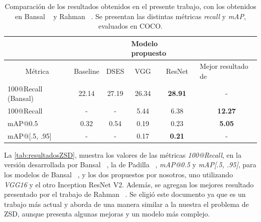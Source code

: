 \begin{table}[H]
	\centering
	\resizebox{\textwidth}{!} {
		\begin{tabular}{|l|c|c|c|c|c|}
			\hline
    		\multicolumn{3}{|l|}{}                                                   & \multicolumn{2}{l|}{Modelo propuesto}               &                               \\ \hline
			\multicolumn{1}{|c|}{{Métrica}} & {Baseline \cite{bansal2018zero}} & \multicolumn{1}{l|}{{DSES \cite{bansal2018zero}}} & {VGG} & { ResNet} & \multicolumn{1}{l|}{{Mejor resultado de \cite{rahman2020zero}}} \\ \hline
			100@Recall (Bansal)             & 22.14                            & 27.19                                             & 26.34              & \textbf{28.91}                 & -                                                               \\ \hline
			100@Recall                      & -                                & -                                                 & 5.44               & 6.38                  & \textbf{12.27}                                                           \\ \hline
			mAP@0.5                         & 0.32                             & 0.54                                              & 0.19               & 0.23                  & \textbf{5.05}                                                            \\ \hline
			mAP@[.5, .95]                   & -                                & -                                                 & 0.17               & \textbf{0.21}                  & -                                                               \\ \hline
		\end{tabular}
	}
	\caption{Comparación de los resultados obtenidos en el presente trabajo, con los obtenidos en Bansal \etal~\cite{bansal2018zero} y Rahman \etal~\cite{rahman2020zero}. Se presentan las distintas métricas \textit{recall} y \textit{mAP}, evaluados en COCO.}
	\label{tab:resultadosZSD}
\end{table}


La \autoref{tab:resultadosZSD}, muestra los valores de las métricas \textit{100@Recall}, en la versión desarrollada por Bansal \etal~\cite{bansal2018zero}, la de Padilla \etal~\cite{padilla2020survey}, \textit{mAP@0.5} y \textit{mAP[.5, .95]}, para los modelos de Bansal \etal~\cite{bansal2018zero}, y los dos propuestos por nosotros, uno utilizando \textit{VGG16} y el otro Inception ResNet V2. Además, se agregan los mejores resultado presentado por el trabajo de Rahman \etal~\cite{rahman2020zero}. Se eligió este documento ya que es un trabajo más actual y aborda de una manera similar a la nuestra el problema de ZSD, aunque presenta algunas mejoras y un modelo más complejo.\\


